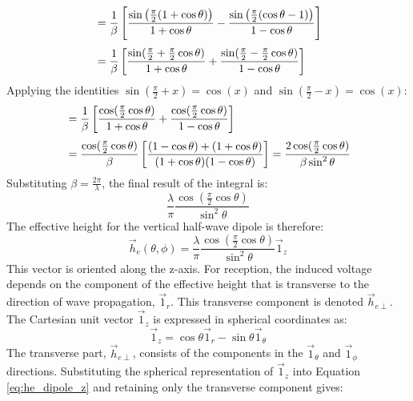 \begin{align}
	&= \frac{1}{\beta} \left[ \frac{\sin\left(\frac{\pi}{2}(1+\cos\theta)\right)}{1+\cos\theta} - \frac{\sin\left(\frac{\pi}{2}(\cos\theta-1)\right)}{1-\cos\theta} \right] \\[\jot]
	&= \frac{1}{\beta} \left[ \frac{\sin(\frac{\pi}{2}+\frac{\pi}{2}\cos\theta)}{1+\cos\theta} + \frac{\sin(\frac{\pi}{2}-\frac{\pi}{2}\cos\theta)}{1-\cos\theta} \right]
\end{align}
\vspace{1em}
Applying the identities $\sin(\frac{\pi}{2}+x) = \cos(x)$ and $\sin(\frac{\pi}{2}-x) = \cos(x)$:
\vspace{1em}
\begin{align}
	&= \frac{1}{\beta} \left[ \frac{\cos(\frac{\pi}{2}\cos\theta)}{1+\cos\theta} + \frac{\cos(\frac{\pi}{2}\cos\theta)}{1-\cos\theta} \right] \\[\jot]
	&= \frac{\cos(\frac{\pi}{2}\cos\theta)}{\beta} \left[ \frac{(1-\cos\theta) + (1+\cos\theta)}{(1+\cos\theta)(1-\cos\theta)} \right] = \frac{2\cos(\frac{\pi}{2}\cos\theta)}{\beta\sin^2\theta}
\end{align}
\vspace{1em}
Substituting $\beta=\frac{2\pi}{\lambda}$, the final result of the integral is:
\begin{equation}
	\frac{\lambda}{\pi} \frac{\cos(\frac{\pi}{2}\cos\theta)}{\sin^2\theta}
\end{equation}
\vspace{0.5em}
The effective height for the vertical half-wave dipole is therefore:
\begin{equation}
	\vec{h}_e(\theta, \phi) = \frac{\lambda}{\pi} \frac{\cos(\frac{\pi}{2}\cos\theta)}{\sin^2\theta} \vec{1}_z
	\label{eq:he_dipole_z}
\end{equation}
\vspace{0.5em}
This vector is oriented along the z-axis. For reception, the induced voltage depends on the component of the effective height that is transverse to the direction of wave propagation, $\vec{1}_r$. This transverse component is denoted $\vec{h}_{e\perp}$. The Cartesian unit vector $\vec{1}_z$ is expressed in spherical coordinates as:
\begin{equation}
	\vec{1}_z = \cos\theta \vec{1}_r - \sin\theta \vec{1}_\theta
\end{equation}
\vspace{0.5em}
The transverse part, $\vec{h}_{e\perp}$, consists of the components in the $\vec{1}_\theta$ and $\vec{1}_\phi$ directions. Substituting the spherical representation of $\vec{1}_z$ into Equation \eqref{eq:he_dipole_z} and retaining only the transverse component gives:

